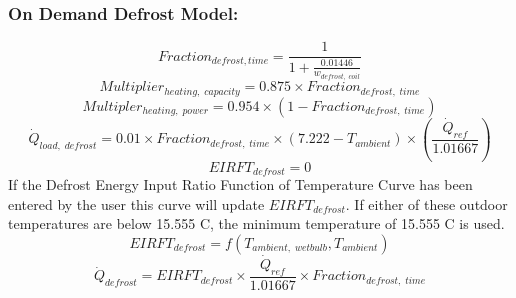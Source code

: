 \subsubsection*{On Demand Defrost Model:}\label{eir-air-to-water-heat-pumps-on-demand-defrost}
\begin{equation}
Fraction_{defrost, time} = \frac{1}{1+\frac{0.01446}{w_{defrost,\; coil}}}
\end{equation}
\begin{equation}
Multiplier_{heating,\; capacity} = {0.875 \times Fraction_{defrost,\; time}}
\end{equation}
\begin{equation}
Multipler_{heating,\; power} = {0.954 \times (1 - Fraction_{defrost,\; time})}
\end{equation}
\begin{equation}
\dot{Q}_{load,\; defrost} = {0.01 \times Fraction_{defrost,\; time} \times (7.222 - T_{ambient}) \times (\frac{\dot{Q}_{ref}}{1.01667})}
\end{equation}
\begin{equation}
EIRFT_{defrost} = 0
\end{equation}
If the Defrost Energy Input Ratio Function of Temperature Curve has been entered by the user this curve will update $EIRFT_{defrost}$.  If either of these outdoor temperatures are below 15.555 C, the minimum temperature of 15.555 C is used.
\begin{equation}
{EIRFT_{defrost} = f(T_{ambient,\; wetbulb}, T_{ambient})}
\end{equation}
\begin{equation}
\dot{Q}_{defrost} = EIRFT_{defrost} \times \frac{\dot{Q}_{ref}}{1.01667} \times Fraction_{defrost,\; time}
\end{equation}

